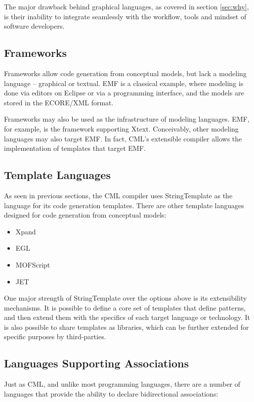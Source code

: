 The major drawback behind graphical languages,
as covered in section \ref{sec:why},
is their inability to integrate seamlessly with the workflow, tools and mindset of software developers.

\subsection{Frameworks}

Frameworks allow code generation from conceptual models, but lack a modeling language -- graphical or textual. 
EMF is a classical example,
where modeling is done via editors on Eclipse or via a programming interface,
and the models are stored in the ECORE/XML format. 

Frameworks may also be used as the infrastructure of modeling languages.
EMF, for example, is the framework supporting Xtext.
Conceivably, other modeling languages may also target EMF.
In fact, CML's extensible compiler allows the implementation of templates that target EMF.

\subsection{Template Languages}

As seen in previous sections,
the CML compiler uses StringTemplate as the language for its code generation templates.
There are other template languages designed for code generation from conceptual models:

\begin{itemize}
\item Xpand
\item EGL
\item MOFScript
\item JET
\end{itemize}

One major strength of StringTemplate over the options above is its extensibility mechanisms.
It is possible to define a core set of templates that define patterns, 
and then extend them with the specifics of each target language or technology.
It is also possible to share templates as libraries,
which can be further extended for specific purposes by third-parties.

\subsection{Languages Supporting Associations}

Just as CML,
and unlike most programming languages,
there are a number of languages that provide the ability to declare bidirectional associations:

